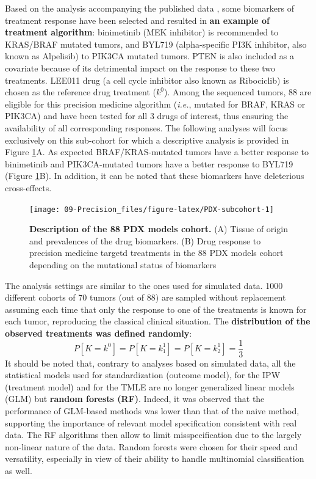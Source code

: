 \documentclass[a4paper,12pt,twoside,onecolumn,openright,final,oldfontcommands]{memoir}
\begin{document}
Based on the analysis accompanying the published data
\citep{gao2015high}, some biomarkers of treatment response have been
selected and resulted in \textbf{an example of treatment algorithm}:
binimetinib (MEK inhibitor) is recommended to KRAS/BRAF mutated tumors,
and BYL719 (alpha-specific PI3K inhibitor, also known as Alpelisib) to
PIK3CA mutated tumors. PTEN is also included as a covariate because of
its detrimental impact on the response to these two treatments. LEE011
drug (a cell cycle inhibitor also known as Ribociclib) is chosen as the
reference drug treatment (\(k^0\)). Among the sequenced tumors, 88 are
eligible for this precision medicine algorithm (\emph{i.e.}, mutated for
BRAF, KRAS or PIK3CA) and have been tested for all 3 drugs of interest,
thus ensuring the availability of all corresponding responses. The
following analyses will focus exclusively on this sub-cohort for which a
descriptive analysis is provided in Figure \ref{fig:PDX-subcohort}A. As
expected BRAF/KRAS-mutated tumors have a better response to binimetinib
and PIK3CA-mutated tumors have a better response to BYL719 (Figure
\ref{fig:PDX-subcohort}B). In addition, it can be noted that these
biomarkers have deleterious cross-effects.

\begin{figure}

{\centering \texttt{[image: 09-Precision\_files/figure-latex/PDX-subcohort-1]} 

}

\caption[Description of the 88 PDX models cohort]{\textbf{Description of the 88 PDX models
cohort.} (A) Tissue of origin and prevalences of the drug biomarkers.
(B) Drug response to precision medicine targetd treatments in the 88 PDX
models cohort depending on the mutational status of biomarkers}\label{fig:PDX-subcohort}
\end{figure}






The analysis settings are similar to the ones used for simulated data.
1000 different cohorts of 70 tumors (out of 88) are sampled without
replacement assuming each time that only the response to one of the
treatments is known for each tumor, reproducing the classical clinical
situation. The \textbf{distribution of the observed treatments was
defined randomly}: \[P[K=k^0]=P[K=k^1_1]=P[K=k^1_2]=\dfrac{1}{3}\] It
should be noted that, contrary to analyses based on simulated data, all
the statistical models used for standardization (outcome model), for the
IPW (treatment model) and for the TMLE are no longer generalized linear
models (GLM) but \textbf{random forests (RF)}. Indeed, it was observed
that the performance of GLM-based methods was lower than that of the
naive method, supporting the importance of relevant model specification
consistent with real data. The RF algorithms then allow to limit
misspecification due to the largely non-linear nature of the data.
Random forests were chosen for their speed and versatility, especially
in view of their ability to handle multinomial classification as well.
\end{document}
